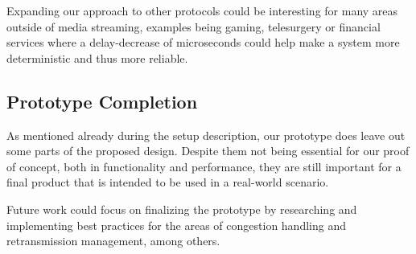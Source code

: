 Expanding our approach to other protocols could be interesting for 
many areas outside of media streaming, examples being gaming, 
telesurgery or financial services where a delay-decrease of 
microseconds could help make a system more deterministic and 
thus more reliable.

\subsection{Prototype Completion}\label{sec:prototype_completion}
As mentioned already during the setup description, our prototype 
does leave out some parts of the proposed design.
Despite them not being essential for our proof of concept,
both in functionality and performance, they are still important
for a final product that is intended to be used in a real-world
scenario.

Future work could focus on finalizing the prototype by researching 
and implementing best practices for the areas of congestion handling
and retransmission management, among others.
